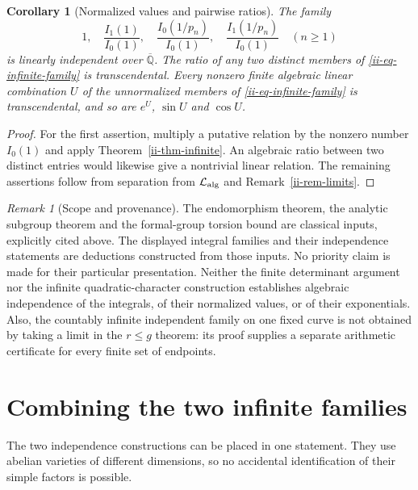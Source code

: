 \documentclass[11pt,a4paper]{article}
\newtheorem{corollary}[theorem]{Corollary}
\theoremstyle{definition}
\theoremstyle{remark}
\newtheorem{remark}[theorem]{Remark}
\numberwithin{equation}{section}
\newcommand{\Qbar}{\overline{\mathbb Q}}
\begin{document}
\begin{corollary}[Normalized values and pairwise ratios]
\label{ii-cor-infinite-ratios}
The family
\[
 1,\quad \frac{I_1(1)}{I_0(1)},\quad
 \frac{I_0(1/p_n)}{I_0(1)},\quad
 \frac{I_1(1/p_n)}{I_0(1)}\quad(n\ge1)
\]
is linearly independent over $\Qbar$.  The ratio of any two distinct
members of \eqref{ii-eq-infinite-family} is transcendental.
Every nonzero finite algebraic linear combination $U$ of the unnormalized
members of \eqref{ii-eq-infinite-family} is transcendental, and so are
$e^U$, $\sin U$ and $\cos U$.
\end{corollary}
\begin{proof}
For the first assertion, multiply a putative relation by the nonzero
number $I_0(1)$ and apply Theorem~\ref{ii-thm-infinite}.  An algebraic
ratio between two distinct entries would likewise give a nontrivial
linear relation.  The remaining assertions follow from separation from
$\mathcal L_{\rm alg}$ and Remark~\ref{ii-rem-limits}.
\end{proof}

\begin{remark}[Scope and provenance]\label{ii-rem-provenance}
The endomorphism theorem, the analytic subgroup theorem and the
formal-group torsion bound are classical inputs, explicitly cited above.
The displayed integral families and their independence statements are
deductions constructed from those inputs.  No priority claim is made
for their particular presentation.  Neither the finite determinant
argument nor the infinite quadratic-character construction establishes
algebraic independence of the integrals, of their normalized values, or
of their exponentials.  Also, the countably infinite independent family
on one fixed curve is not obtained by taking a limit in the
$r\le g$ theorem: its proof supplies a separate arithmetic certificate
for every finite set of endpoints.
\end{remark}



\section{Combining the two infinite families}
\label{joint-section}
The two independence constructions can be placed in one statement.
They use abelian varieties of different dimensions, so no accidental
identification of their simple factors is possible.
\end{document}
